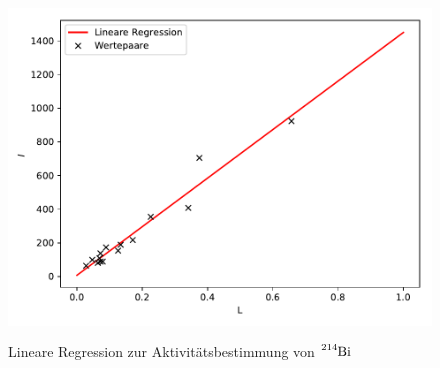 \begin{figure}
  \centering
  \includegraphics[height=9cm]{plot12.pdf}
  \caption{Lineare Regression zur Aktivitätsbestimmung von $\ce{^{214}Bi}$}
  \label{fig:plot12}
\end{figure}
